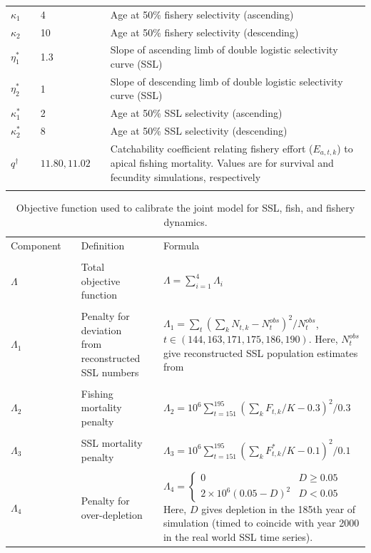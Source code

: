 \documentclass[nonumbib,leqno]{nrc1}
\begin{document}
\begin{longtable}{p{2.5cm}lp{2.5cm}l p{8cm}}
$\kappa_1$ & & 4 & & Age at 50\% fishery selectivity (ascending) \\
$\kappa_2$ & & 10 & & Age at 50\% fishery selectivity (descending) \\
$\eta_1^*$ & & 1.3 & & Slope of ascending limb of double logistic selectivity curve (SSL) \\
$\eta_2^*$ & & 1 & & Slope of descending limb of double logistic selectivity curve (SSL) \\
$\kappa_1^*$ & & 2 & & Age at 50\% SSL selectivity (ascending) \\
$\kappa_2^*$ & & 8 & & Age at 50\% SSL selectivity (descending) \\
$ q ^\dag $ & & $11.80,11.02$ & & Catchability coefficient relating fishery effort ($E_{a,t,k}$) to apical fishing mortality.  Values are for survival and fecundity simulations, respectively \\
\vspace{4in}
\end{longtable}

\begin{table}
\caption{ \large Objective function used to calibrate the joint model for SSL, fish, and
fishery dynamics.}
\label{tab:objfun}
\begin{tabular}{llp{3cm}lp{6cm}}
\\
\hline \hline
Component & & Definition & & Formula \\
\cline{1-1} \cline{3-3} \cline{5-5}
\\
$\Lambda$ & & Total objective function & & $\Lambda=\sum_{i=1}^4 \Lambda_i$ \\
& & & & \\
$\Lambda_1$ & & Penalty for deviation from reconstructed SSL numbers & & $\Lambda_1= \sum_t (\sum_k N_{t,k}-N_t^{obs})^2/N_t^{obs}$, $t \in (144,163,171,175,186,190)$. Here, $N_t^{obs}$ give reconstructed SSL population estimates from \citet{Goodman2008} \\
& & & & \\
$\Lambda_2$ & & Fishing mortality penalty & & $\Lambda_2=10^6 \sum_{t=151}^{195} (\sum_k F_{t,k}/K - 0.3)^2/0.3$ \\
& & & & \\
$\Lambda_3$ & & SSL mortality penalty & & $\Lambda_3=10^6 \sum_{t=151}^{195} (\sum_k F_{t,k}^*/K - 0.1)^2/0.1$ \\
& & & & \\
$\Lambda_4$ & & Penalty for over-depletion & & $ \Lambda_4 = \left\{ \begin{array}{cc} 0 &  D \ge 0.05 \\ 2 \times 10^6 (0.05-D)^2 &  D < 0.05 \end{array} \right.$  Here, $D$ gives depletion in the 185th year of simulation (timed to coincide with year 2000 in the real world SSL time series).\\
\bottomrule
\end{tabular}
\vspace{4in}
\end{table}
\end{document}
